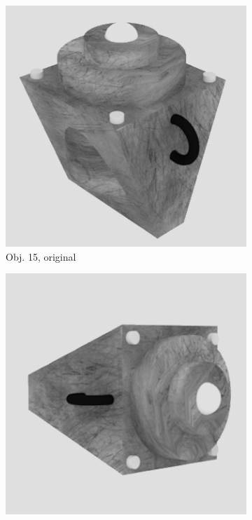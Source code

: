 \begin{figure}
\medskip
\begin{subfigure}{0.2\textwidth}
\includegraphics[width=\linewidth]{Bilder/Objekt15A.png}
\caption{Obj. 15, original} \label{fig:c}
\end{subfigure}\hspace{.5cm} %
\begin{subfigure}{0.2\textwidth}
\includegraphics[width=\linewidth]{Bilder/Objekt15B.png}

\end{subfigure}
\end{figure}
